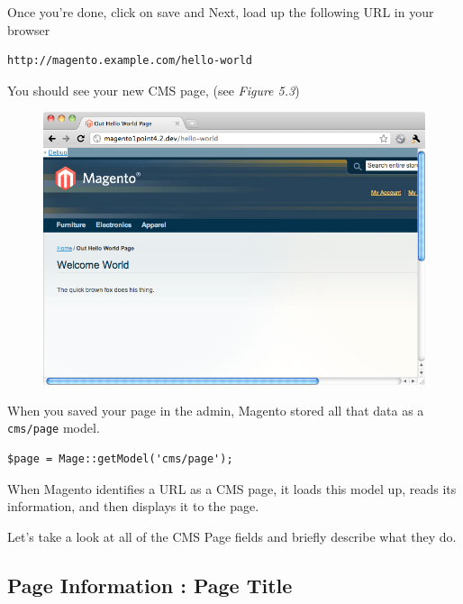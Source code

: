 \documentclass[oneside]{book}
\begin{document}
Once you're done, click on save and Next, load up the following URL in your browser

\begin{lstlisting}
http://magento.example.com/hello-world

\end{lstlisting}


You should see your new CMS page, (see \emph{Figure 5.3})

\begin{figure}[htb]
\begin{center}
\leavevmode
\includegraphics[width=1\textwidth]{images/chapter6/page1.png}
\end{center}
\caption{}
\end{figure}


When you saved your page in the admin, Magento stored all that data as a \footnotesize\texttt{cms/page} \normalsize  model.

\begin{lstlisting}
$page = Mage::getModel('cms/page');

\end{lstlisting}


When Magento identifies a URL as a CMS page, it loads this model up, reads its information, and then displays it to the page.

Let's take a look at all of the CMS Page fields and briefly describe what they do.

\subsection{Page Information : Page Title}
\end{document}
